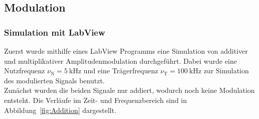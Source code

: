 \documentclass[a4paper,twoside,final]{article}
\begin{document}
\subsection{Modulation}
\subsubsection{Simulation mit LabView}
Zuerst wurde mithilfe eines LabView Programms eine Simulation von additiver und multiplikativer Amplitudenmodulation durchgeführt. Dabei wurde eine Nutzfrequenz $\nu_\text{N} = \SI{5}{\kilo\hertz}$ und eine Trägerfrequenz $\nu_\text{T} = \SI{100}{\kilo\hertz}$ zur Simulation des modulierten Signals benutzt.\\
Zunächst wurden die beiden Signale nur addiert, wodurch noch keine Modulation entsteht. Die Verläufe im Zeit- und Frequenzbereich sind in Abbildung~\ref{fig:Addition} dargestellt.
\end{document}
